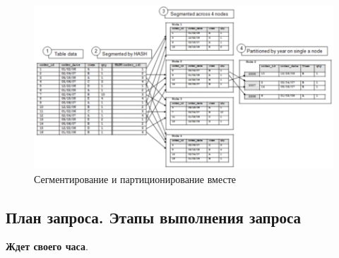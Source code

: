 \begin{figure}[h]
	\centering
	\includegraphics[width=18cm, keepaspectratio]{assets/segm.png}
	\caption{Сегментирование и партиционирование вместе} 
\end{figure}



\subsection{План запроса. Этапы выполнения запроса}

\textbf{Ждет своего часа}.
